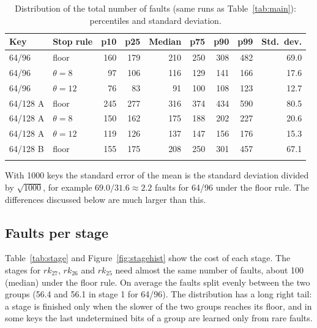 \documentclass[pdflatex,sn-mathphys-num]{sn-jnl}
\theoremstyle{thmstyleone}%
\theoremstyle{thmstylethree}%
\newcommand{\rk}{\mathit{rk}}
\begin{document}
\begin{table}[t]
\caption{Distribution of the total number of faults (same runs as Table~\ref{tab:main}): percentiles
and standard deviation.}\label{tab:quant}
\begin{tabular*}{\textwidth}{@{\extracolsep\fill}llrrrrrrr@{}}
\toprule
Key & Stop rule & p10 & p25 & Median & p75 & p90 & p99 & Std.\ dev.\\
\midrule
64/96 & floor & 160 & 179 & 210 & 250 & 308 & 482 & 69.0\\
64/96 & $\theta=8$ & 97 & 106 & 116 & 129 & 141 & 166 & 17.6\\
64/96 & $\theta=12$ & 76 & 83 & 91 & 100 & 108 & 123 & 12.7\\
64/128 A & floor & 245 & 277 & 316 & 374 & 434 & 590 & 80.5\\
64/128 A & $\theta=8$ & 150 & 162 & 175 & 188 & 202 & 227 & 20.6\\
64/128 A & $\theta=12$ & 119 & 126 & 137 & 147 & 156 & 176 & 15.3\\
64/128 B & floor & 155 & 175 & 208 & 250 & 301 & 457 & 67.1\\
\botrule
\end{tabular*}
\end{table}

With 1000 keys the standard error of the mean is the standard deviation divided by $\sqrt{1000}$, for
example $69.0/31.6\approx 2.2$ faults for 64/96 under the floor rule. The differences discussed below are
much larger than this.

\subsection{Faults per stage}

Table~\ref{tab:stage} and Figure~\ref{fig:stagehist} show the cost of each stage. The stages for
$\rk_{27}$, $\rk_{26}$ and $\rk_{25}$ need almost the same number of faults, about 100 (median) under the
floor rule. On average the faults split evenly between the two groups (56.4 and 56.1 in stage 1 for
64/96). The distribution has a long right tail: a stage is finished only when the slower of the two groups
reaches its floor, and in some keys the last undetermined bits of a group are learned only from rare
faults.
\end{document}
